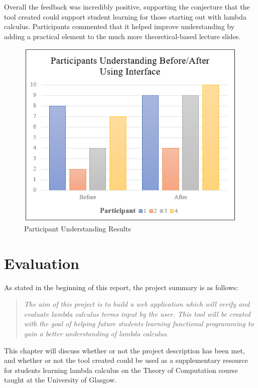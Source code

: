 \documentclass[a4paper,12pt]{report}
\begin{document}
Overall the feedback was incredibly positive, supporting the conjecture that the tool created could support student learning for those starting out with lambda calculus. Participants commented that it helped improve understanding by adding a practical element to the much more theoretical-based lecture slides.\\


\begin{figure}[h]
	\includegraphics{images/participant_understanding}
	\centering
	\caption{Participant Understanding Results}
	\label{participant_understanding}
\end{figure}

\chapter{Evaluation}

As stated in the beginning of this report, the project summary is as follows:

\begin{quote}
	 \textit{The aim of this project is to build a web application which will verify and evaluate lambda calculus terms input by the user. This tool will be created with the goal of helping future students learning functional programming to gain a better understanding of lambda calculus.}
\end{quote}

This chapter will discuss whether or not the project description has been met, and whether or not the tool created could be used as a supplementary resource for students learning lambda calculus on the Theory of Computation course taught at the University of Glasgow.
\end{document}
